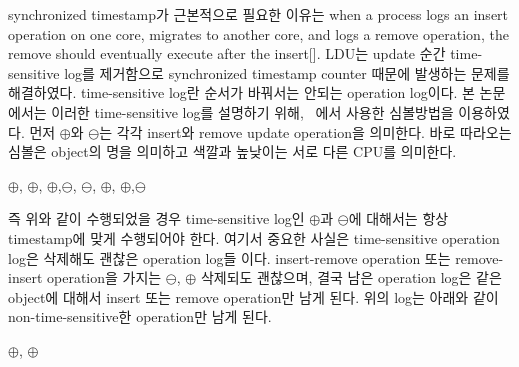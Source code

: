 \ifkor
\else
\fi

\ifkor
synchronized timestamp가 근본적으로 필요한 이유는 when a process logs an insert operation
on one core, migrates to another core, and logs a remove operation, the remove
should eventually execute after the insert[].
LDU는 update 순간 time-sensitive log를 제거함으로 synchronized timestamp counter 때문에 발생하는
문제를 해결하였다.
time-sensitive log란 순서가 바꿔서는 안되는 operation log이다. 
본 논문에서는 이러한 time-sensitive log를 설명하기 위해, ~\cite{Clements15SCR}에서 사용한 심볼방법을
이용하였다.
먼저 $\oplus$와 $\ominus$는 각각 insert와 remove update operation을 의미한다.
바로 따라오는 심볼은 object의 명을 의미하고 색깔과 높낮이는 서로 다른 CPU를 의미한다.
\begin{center}
$\oplus$, $\oplus$, $\oplus$,$\ominus$,
$\ominus$, $\oplus$, $\oplus$,$\ominus$
\end{center}
즉 위와 같이 수행되었을 경우 time-sensitive log인 $\oplus$과 $\ominus$에
대해서는 항상 timestamp에 맞게 수행되어야 한다.
여기서 중요한 사실은 time-sensitive operation log은 삭제해도 괜찮은 operation log들 이다.
insert-remove operation 또는 remove-insert operation을 가지는 
$\ominus$, $\oplus$ 삭제되도 괜찮으며, 결국 남은 operation log은 같은
object에 대해서 insert 또는 remove operation만 남게 된다.
위의 log는 아래와 같이 non-time-sensitive한 operation만 남게 된다.
\begin{center}
 $\oplus$, $\oplus$
\end{center}
